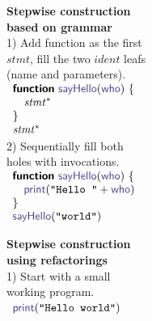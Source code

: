 \documentclass[nonacm,anonymous,sigplan,screen]{acmart}
\newcommand{\ident}[1]{\textsf{\color{DarkSlateBlue}{#1}}}
\newcommand{\kvd}[1]{\textsf{\bfseries #1}}
\begin{document}
\begin{figure}[t]
\small
\raggedright

\begin{minipage}[t]{.49\columnwidth}
\textbf{Stepwise construction\\based on grammar}\\[-0.5em]

1) Add function as the first\\
$\mathit{stmt}$, fill the two $\mathit{ident}$ leafs\\
(name and parameters).\\[0.5em]
  $\begin{array}{l}
  \kvd{function}~\ident{sayHello}(\ident{who})~\{\\
  \quad\mathit{stmt}^{*}\\
  \}\\
  \mathit{stmt}^{*}
  \end{array}$
\\[0.75em]

2) Sequentially fill both \\
holes with invocations.\\[0.5em]
  $\begin{array}{l}
  \kvd{function}~\ident{sayHello}(\ident{who})~\{\\
  \quad\ident{print}(\texttt{''Hello ''} + \ident{who})\\
  \}\\
  \ident{sayHello}(\texttt{''world''})
  \end{array}$
\end{minipage}%
\begin{minipage}[t]{.49\columnwidth}
\textbf{Stepwise construction\\using refactorings}\\[-0.5em]

1) Start with a small \\
working program.\\[0.5em]
  $\begin{array}{l}
  \ident{print}(\texttt{''Hello world''})
  \end{array}$
\\[-0.5em]


\end{minipage}
\end{figure}
\end{document}
